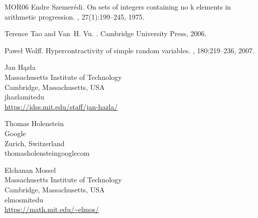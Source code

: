 \documentclass{daj}
\newcommand{\1}{\mathbbm{1}}
\theoremstyle{plain}
\theoremstyle{definition}
\begin{document}
\begin{thebibliography}{MOR{\etalchar{+}}06}
Endre Szemerédi.
\newblock On sets of integers containing no k elements in arithmetic
  progression.
, 27(1):199--245, 1975.

Terence Tao and Van~H. Vu.
.
\newblock Cambridge University Press, 2006.

Paweł Wolff.
\newblock Hypercontractivity of simple random variables.
, 180:219--236, 2007.
\end{thebibliography}


\begin{dajauthors}
\begin{authorinfo}[jh]
  Jan Hązła\\
  Massachusetts Institute of Technology\\
  Cambridge, Massachusetts, USA\\
  jhazla\imageat{}mit\imagedot{}edu \\
  \url{https://idss.mit.edu/staff/jan-hazla/}
\end{authorinfo}
\begin{authorinfo}[th]
  Thomas Holenstein\\
  Google\\
  Zurich, Switzerland\\
  thomas\imagedot{}holenstein\imageat{}google\imagedot{}com \\
\end{authorinfo}
\begin{authorinfo}[em]
  Elchanan Mossel\\
  Massachusetts Institute of Technology\\
  Cambridge, Massachusetts, USA\\
  elmos\imageat{}mit\imagedot{}edu\\
  \url{https://math.mit.edu/~elmos/}
\end{authorinfo}
\end{dajauthors}
\end{document}
